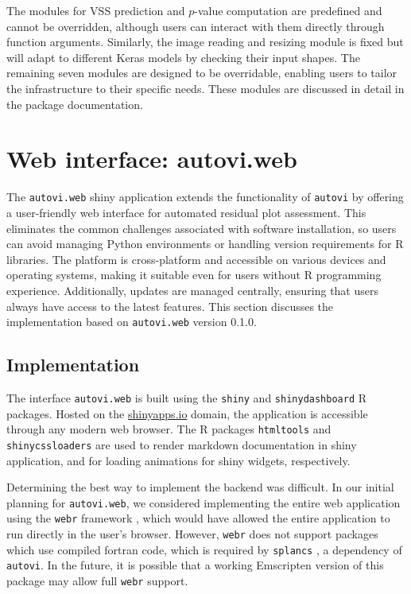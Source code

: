 \documentclass[
doublespace,
  times]{anzsauth}
\begin{document}
The modules for VSS prediction and \(p\)-value computation are
predefined and cannot be overridden, although users can interact with
them directly through function arguments. Similarly, the image reading
and resizing module is fixed but will adapt to different Keras models by
checking their input shapes. The remaining seven modules are designed to
be overridable, enabling users to tailor the infrastructure to their
specific needs. These modules are discussed in detail in the package
documentation.

\section{Web interface: autovi.web}\label{sec-autovi-web}

The \texttt{autovi.web} shiny application extends the functionality of
\texttt{autovi} by offering a user-friendly web interface for automated
residual plot assessment. This eliminates the common challenges
associated with software installation, so users can avoid managing
Python environments or handling version requirements for R libraries.
The platform is cross-platform and accessible on various devices and
operating systems, making it suitable even for users without R
programming experience. Additionally, updates are managed centrally,
ensuring that users always have access to the latest features. This
section discusses the implementation based on \texttt{autovi.web}
version 0.1.0.

\subsection{Implementation}\label{implementation}

The interface \texttt{autovi.web} is built using the \texttt{shiny}
\citep{shiny} and \texttt{shinydashboard} \citep{shinydashboard} R
packages. Hosted on the \href{https://www.shinyapps.io}{shinyapps.io}
domain, the application is accessible through any modern web browser.
The R packages \texttt{htmltools} \citep{htmltools} and
\texttt{shinycssloaders} \citep{shinycssloaders} are used to render
markdown documentation in shiny application, and for loading animations
for shiny widgets, respectively.

Determining the best way to implement the backend was difficult. In our
initial planning for \texttt{autovi.web}, we considered implementing the
entire web application using the \texttt{webr} framework \citep{webr},
which would have allowed the entire application to run directly in the
user's browser. However, \texttt{webr} does not support packages which
use compiled fortran code, which is required by \texttt{splancs}
\citep{splancs}, a dependency of \texttt{autovi}. In the future, it is
possible that a working Emscripten \citep{zakai2011emscripten} version
of this package may allow full \texttt{webr} support.
\end{document}
